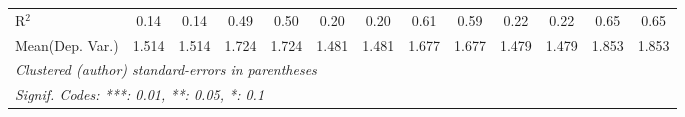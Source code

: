 \begin{tabular}{lcccccccccccc}
   R$^2$                                    & 0.14          & 0.14          & 0.49          & 0.50           & 0.20          & 0.20          & 0.61        & 0.59    & 0.22          & 0.22          & 0.65    & 0.65\\  
Mean(Dep. Var.) & 1.514 & 1.514 & 1.724 & 1.724 & 1.481 & 1.481 & 1.677 & 1.677 & 1.479 & 1.479 & 1.853 & 1.853 \\
   \midrule \midrule
   \multicolumn{13}{l}{\emph{Clustered (author) standard-errors in parentheses}}\\
   \multicolumn{13}{l}{\emph{Signif. Codes: ***: 0.01, **: 0.05, *: 0.1}}\\
\end{tabular}
\par\endgroup
